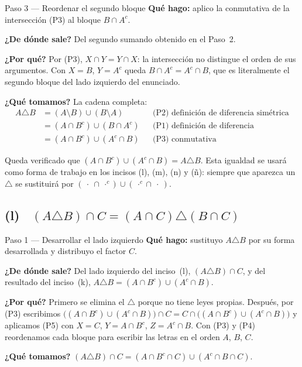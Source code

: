 \documentclass[11pt]{article}
\begin{document}
\begin{paso}{Paso 3 --- Reordenar el segundo bloque}
\textbf{Qué hago:} aplico la conmutativa de la intersección (P3) al bloque $B\cap A^{c}$.

\textbf{¿De dónde sale?} Del segundo sumando obtenido en el Paso~2.

\textbf{¿Por qué?} Por (P3), $X\cap Y=Y\cap X$: la intersección no distingue el orden de sus
argumentos. Con $X=B$, $Y=A^{c}$ queda $B\cap A^{c}=A^{c}\cap B$, que es literalmente el segundo
bloque del lado izquierdo del enunciado.

\textbf{¿Qué tomamos?} La cadena completa:
\begin{align*}
A\triangle B
&=(A\setminus B)\cup(B\setminus A) && \text{(P2) definición de diferencia simétrica}\\
&=(A\cap B^{c})\cup(B\cap A^{c}) && \text{(P1) definición de diferencia}\\
&=(A\cap B^{c})\cup(A^{c}\cap B) && \text{(P3) conmutativa}
\end{align*}
\end{paso}

\begin{resp}
Queda verificado que $(A\cap B^{c})\cup(A^{c}\cap B)=A\triangle B$. Esta igualdad se usará como
forma de trabajo en los incisos (l), (m), (n) y (ñ): siempre que aparezca un $\triangle$ se
sustituirá por $(\ \cdot\ \cap\ \cdot^{c})\cup(\ \cdot^{c}\cap\ \cdot\ )$.
\end{resp}

\subsection*{(l) \ $(A\triangle B)\cap C=(A\cap C)\triangle(B\cap C)$}

\begin{paso}{Paso 1 --- Desarrollar el lado izquierdo}
\textbf{Qué hago:} sustituyo $A\triangle B$ por su forma desarrollada y distribuyo el factor $C$.

\textbf{¿De dónde sale?} Del lado izquierdo del inciso~(l), $(A\triangle B)\cap C$, y del
resultado del inciso~(k), $A\triangle B=(A\cap B^{c})\cup(A^{c}\cap B)$.

\textbf{¿Por qué?} Primero se elimina el $\triangle$ porque no tiene leyes propias. Después, por
(P3) escribimos $\bigl((A\cap B^{c})\cup(A^{c}\cap B)\bigr)\cap C=C\cap\bigl((A\cap B^{c})\cup(A^{c}\cap B)\bigr)$
y aplicamos (P5) con $X=C$, $Y=A\cap B^{c}$, $Z=A^{c}\cap B$. Con (P3) y (P4) reordenamos cada
bloque para escribir las letras en el orden $A$, $B$, $C$.

\textbf{¿Qué tomamos?}
$(A\triangle B)\cap C=(A\cap B^{c}\cap C)\cup(A^{c}\cap B\cap C)$.
\end{paso}
\end{document}
